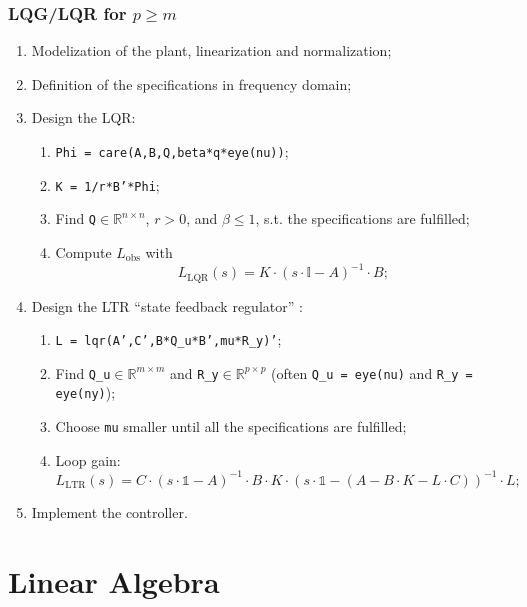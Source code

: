 \documentclass[a4paper,12 pt]{article}
\numberwithin{equation}{section}
\theoremstyle{definition}
\theoremstyle{remark}
\theoremstyle{definition}
\theoremstyle{definition}
\theoremstyle{definition}
\theoremstyle{remark}
\begin{document}
\subsubsection{LQG/LQR for $p\geq m$}
\begin{enumerate}
\item Modelization of the plant, linearization and normalization;
\item Definition of the specifications in frequency domain;
\item Design the LQR:
\begin{enumerate}
\item \texttt{Phi = care(A,B,Q,beta*q*eye(nu))};
\item \texttt{K = 1/r*B'*Phi};
\item Find \texttt{Q}$\in\mathbb{R}^{n\times n}$, $r>0$, and $\beta\leq 1$, s.t. the specifications are fulfilled;
\item Compute $L_\text{obs}$ with
\begin{equation}
L_\text{LQR}(s)=K\cdot (s\cdot \mathbb{I}-A)^{-1}\cdot B;
\end{equation}
\end{enumerate}
\item Design the LTR ``state feedback regulator'' :
\begin{enumerate}
\item \texttt{L = lqr(A',C',B*Q\_u*B',mu*R\_y)'};
\item Find \texttt{Q\_u}$\in\mathbb{R}^{m\times m}$ and \texttt{R\_y}$\in\mathbb{R}^{p\times p}$ (often \texttt{Q\_u = eye(nu)} and \texttt{R\_y = eye(ny)});
\item Choose \texttt{mu} smaller until all the specifications are fulfilled;
\item Loop gain:
\begin{equation}
L_\text{LTR}(s)=C\cdot (s\cdot \mathbb{1}-A)^{-1}\cdot B\cdot K\cdot(s\cdot\mathbb{1}-(A-B\cdot K-L\cdot C))^{-1}\cdot L;
\end{equation}
\end{enumerate}
\item Implement the controller.
\end{enumerate}

\newpage

\appendix
\section{Linear Algebra}
\end{document}
